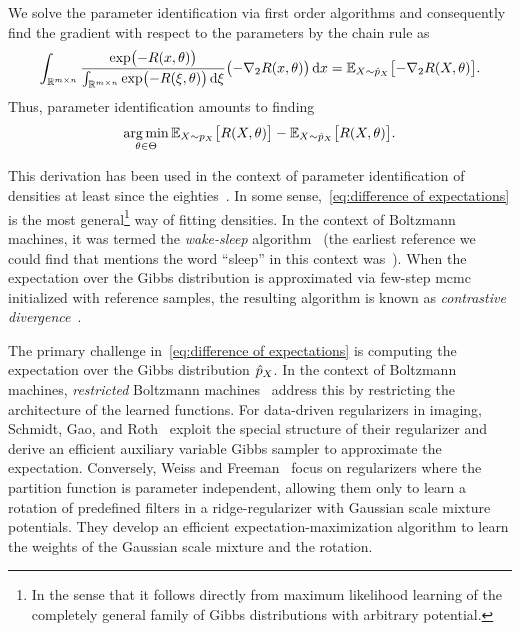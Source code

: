 We solve the parameter identification via first order algorithms and consequently find the gradient with respect to the parameters by the chain rule as
\begin{equation}
	\int_{\mathbb{R}^{m\times n}}\frac{\exp\bigl(-R(x, \theta)\bigr)}{\int_{\mathbb{R}^{m\times n}}\exp\bigl(-R(\xi, \theta)\bigr)\,\mathrm{d}\xi} \bigl(-\nabla_{\num{2}} R(x, \theta) \bigr)\,\mathrm{d}x = \mathbb{E}_{X\sim\hat{p}_{X}}\bigl[-\nabla_{\num{2}} R(X, \theta) \bigr].
\end{equation}
Thus, parameter identification amounts to finding
\begin{equation}
	\operatorname*{arg\,min}_{\theta \in \Theta} \mathbb{E}_{X\sim p_X} \bigl[ R(X, \theta) \bigr] -\mathbb{E}_{X\sim\hat{p}_{X}} \bigl[ R(X, \theta) \bigr].
	\label{eq:difference of expectations}
\end{equation}

This derivation has been used in the context of parameter identification of densities at least since the eighties~\cite{ackley1985learning}.
In some sense,~\cref{eq:difference of expectations} is the most general\footnote{%
	In the sense that it follows directly from maximum likelihood learning of the completely general family of Gibbs distributions with arbitrary potential.%
} way of fitting densities.
In the context of Boltzmann machines, it was termed the \emph{wake-sleep} algorithm~\cite{hinton1995wake} (the earliest reference we could find that mentions the word \enquote{sleep} in this context was~\cite{freund1991unsupervised}).
When the expectation over the Gibbs distribution is approximated via few-step \gls{mcmc} initialized with reference samples, the resulting algorithm is known as \emph{contrastive divergence}~\cite{hinton_training_2002}.

The primary challenge in~\cref{eq:difference of expectations} is computing the expectation over the Gibbs distribution \( \hat{p}_{X} \).
In the context of Boltzmann machines, \emph{restricted} Boltzmann machines~\cite{rumelhart1986parallel} address this by restricting the architecture of the learned functions.
For data-driven regularizers in imaging, Schmidt, Gao, and Roth~\cite{schmidt_generative_2010} exploit the special structure of their regularizer and derive an efficient auxiliary variable Gibbs sampler to approximate the expectation.
Conversely, Weiss and Freeman~\cite{weiss_model_2007} focus on regularizers where the partition function is parameter independent, allowing them only to learn a rotation of predefined filters in a ridge-regularizer with Gaussian scale mixture potentials.
They develop an efficient expectation-maximization algorithm to learn the weights of the Gaussian scale mixture and the rotation.

